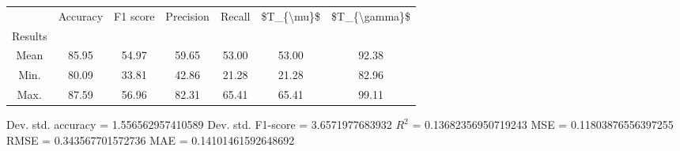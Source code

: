 \begin{tabular}{|c|c|c|c|c|c|c|}
\toprule
{} &  Accuracy &  F1 score &  Precision &  Recall &  \$T\_\{\textbackslash mu\}\$ &  \$T\_\{\textbackslash gamma\}\$ \\
Results &           &           &            &         &            &               \\
\hline
Mean    &     85.95 &     54.97 &      59.65 &   53.00 &      53.00 &         92.38 \\
Min.    &     80.09 &     33.81 &      42.86 &   21.28 &      21.28 &         82.96 \\
Max.    &     87.59 &     56.96 &      82.31 &   65.41 &      65.41 &         99.11 \\
\bottomrule
\end{tabular}

 Dev. std. accuracy = 1.556562957410589
 Dev. std. F1-score = 3.6571977683932
 $R^2$ = 0.13682356950719243
 MSE = 0.11803876556397255
 RMSE = 0.343567701572736
 MAE = 0.14101461592648692